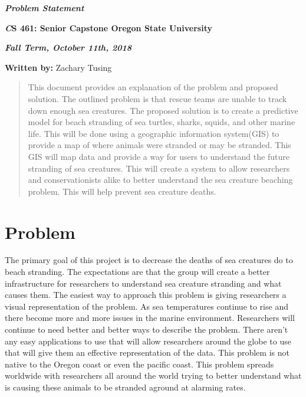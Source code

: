 \documentclass[onecolumn, draftclsnofoot,10pt, compsoc]{IEEEtran}
\def \ClassName{        CS 461: Senior Capstone }
\def \GroupMemberThree{         Zachary Tusing }
\begin{document}
    \begin{center}
    \huge\bf{ } 
   
    \large\textbf{\textit{Problem Statement}}\par
     
    
    
    \small{\bf\textit \ClassName Oregon State University}\par
    
    
    {\bf\textit{ Fall Term, October 11th, 2018} }
    
    
   {\small {\bf Written by:} \GroupMemberThree }
        \end{center}
    \begin{abstract}
    This document provides an explanation of the problem and proposed solution. The outlined problem is that rescue teams are unable to track down enough sea creatures. The proposed solution is to create a predictive model for beach stranding of sea turtles, sharks, squids, and other marine life. This will be done using a geographic information system(GIS) to provide a map of where animals were stranded or may be stranded. This GIS will map data and provide a way for users to understand the future stranding of sea creatures. This will create a system to allow researchers and conservationists alike to better understand the sea creature beaching problem. This will help prevent sea creature deaths.
    \end{abstract}
        
       \pagebreak

       \section{Problem}
          The primary goal of this project is to decrease the deaths of sea creatures do to beach stranding. The expectations are that the group will create a better infrastructure for researchers to understand sea creature stranding and what causes them. The easiest way to approach this problem is giving researchers a visual representation of the problem. As sea temperatures continue to rise and there become more and more issues in the marine environment. Researchers will continue to need better and better ways to describe the problem. There aren't any easy applications to use that will allow researchers around the globe to use that will give them an effective representation of the data. This problem is not native to the Oregon coast or even the pacific coast. This problem spreads worldwide with researchers all around the world trying to better understand what is causing these animals to be stranded aground at alarming rates.
\end{document}
